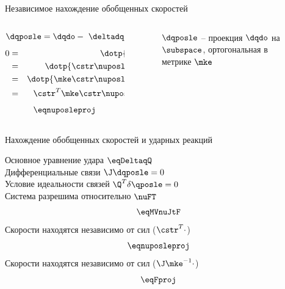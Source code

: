 \begin{frame}{Независимое нахождение обобщенных скоростей}
    \begin{columns}
        \hspace{15pt}
        \begin{column}{0.35\textwidth}
            $$ \dqposle = \dqdo -\ \deltadq = \mathbf{V}\nuposle \in \subspace $$
            \begin{eqnarray*}
                0 & = & \dotp{\deltadq}{\mke\cstr} \\
                  & = & \dotp{\cstr\nuposle - \dqdo}{\mke\cstr} \\
                  & = & \dotp{\mke\cstr\nuposle - \mke\dqdo}{\cstr} \\
                  & = & \cstr^T\mke\cstr\nuposle - \cstr^T\mke\dqdo
            \end{eqnarray*}
            \vspace{0.35pt}
            $$ \eqnuposleproj $$
        \end{column}
        \hspace{55pt}
        \begin{column}{0.65\textwidth}
            \begin{figure}
                \hspace{-65pt}
                \caption{
                    $\dqposle$ -- проекция $\dqdo$ на $\subspace$,\newline
                    ортогональная в метрике $\mke$
                }
            \end{figure}
        \end{column}
    \end{columns}
\end{frame}

\begin{frame}{Нахождение обобщенных скоростей и ударных реакций}
    
    Основное уравнение удара  \quad \quad \quad \quad $ \eqDeltaqQ $ \\
    Дифференциальные связи  \quad \quad \quad \quad $ \J\dqposle = 0 $ \\
    Условие идеальности связей \quad \quad \quad $ \Q^T\delta\qposle = 0 $ \\

    Система разрешима относительно $\nuFT$
    $$ \eqMVnuJtF $$
    Скорости находятся независимо от сил ($\cstr^T\cdot$)    
    $$ \eqnuposleproj $$
    Скорости находятся независимо от сил ($\J\mke^{-1}\cdot$)    
    $$ \eqFproj $$
    
\end{frame}


